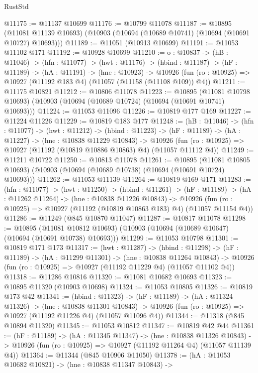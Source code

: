 \begin{lexlean}{RustStd}
\begin{coremodule}
@11175 := @11137 @10699
@11176 := @10799 @11078
@11187 := @10895
    (@11081 @11139 @10693)
    (@10903 (@10694 (@10689 @10741) (@10694 (@10691 @10727) @10693)))
@11189 := @11051 (@10913 @10699)
@11191 := @11053 @11102 @171
@11192 := @10928 @10699
@11210 := {o : @10837} ->
  (hB : @11046) ->
  (hfn : @11077) ->
  (hwt : @11176) ->
  (hbind : @11187) ->
  (hF : @11189) ->
  (hA : @11191) ->
  (hne : @10923) ->
  @10926 (fun (ro : @10925) => @10927 (@11192 @183 @4) (@11057 (@11158 (@11108 @109)) @4))
@11211 := @11175 @10821
@11212 := @10806 @11078
@11223 := @10895
    (@11081 @10798 @10693)
    (@10903 (@10694 (@10689 @10724) (@10694 (@10691 @10741) @10693)))
@11224 := @11053 @11096
@11226 := @10819 @177 @169
@11227 := @11224 @11226
@11229 := @10819 @183 @177
@11248 := (hB : @11046) ->
  (hfn : @11077) ->
  (hwt : @11212) ->
  (hbind : @11223) ->
  (hF : @11189) ->
  (hA : @11227) ->
  (hne : @10838 @11229 @10843) ->
  @10926 (fun (ro : @10925) => @10927 (@11192 (@10819 @10886 @10863) @4) (@11057 @11112 @4))
@11249 := @11211 @10722
@11250 := @10813 @11078
@11261 := @10895
    (@11081 @10805 @10693)
    (@10903 (@10694 (@10689 @10738) (@10694 (@10691 @10724) @10693)))
@11262 := @11053 @11139
@11264 := @10819 @169 @171
@11283 := (hfn : @11077) ->
  (hwt : @11250) ->
  (hbind : @11261) ->
  (hF : @11189) ->
  (hA : @11262 @11264) ->
  (hne : @10838 @11226 @10843) ->
  @10926 (fun (ro : @10925) => @10927 (@11192 (@10819 @10863 @183) @4) (@11057 @11154 @4))
@11286 := @11249 (@845 @10870 @11047)
@11287 := @10817 @11078
@11298 := @10895
    (@11081 @10812 @10693)
    (@10903 (@10694 (@10689 @10647) (@10694 (@10691 @10738) @10693)))
@11299 := @11053 @10798
@11301 := @10819 @171 @173
@11317 := (hwt : @11287) ->
  (hbind : @11298) ->
  (hF : @11189) ->
  (hA : @11299 @11301) ->
  (hne : @10838 @11264 @10843) ->
  @10926 (fun (ro : @10925) => @10927 (@11192 @11229 @4) (@11057 @11102 @4))
@11318 := @11286 @10816
@11320 := @11081 @10682 @10693
@11323 := @10895 @11320 (@10903 @10698)
@11324 := @11053 @10805
@11326 := @10819 @173 @42
@11341 := (hbind : @11323) ->
  (hF : @11189) ->
  (hA : @11324 @11326) ->
  (hne : @10838 @11301 @10843) ->
  @10926 (fun (ro : @10925) => @10927 (@11192 @11226 @4) (@11057 @11096 @4))
@11344 := @11318 (@845 @10894 @11320)
@11345 := @11053 @10812
@11347 := @10819 @42 @44
@11361 := (hF : @11189) ->
  (hA : @11345 @11347) ->
  (hne : @10838 @11326 @10843) ->
  @10926 (fun (ro : @10925) => @10927 (@11192 @11264 @4) (@11057 @11139 @4))
@11364 := @11344 (@845 @10906 @11050)
@11378 := (hA : @11053 @10682 @10821) ->
  (hne : @10838 @11347 @10843) ->

\end{coremodule}
\end{lexlean}
